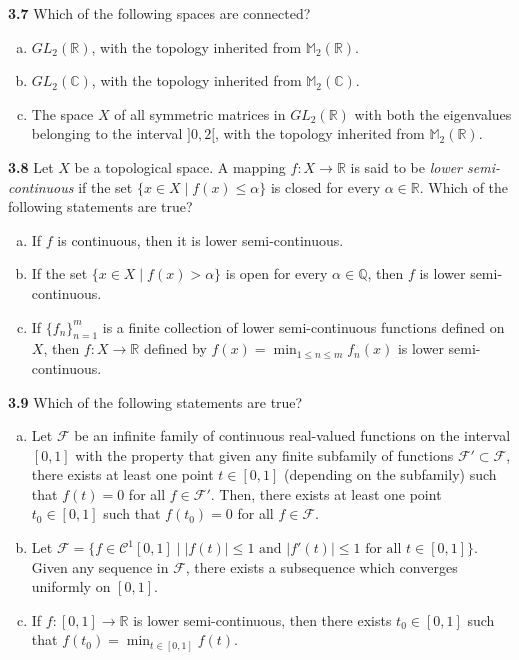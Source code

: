 \documentclass[11pt,a4paper]{article}
\newcommand{\Q}{\mathbb{Q}}
\newcommand{\R}{\mathbb{R}}
\newcommand{\C}{\mathbb{C}}
\newcommand{\M}{\mathbb{M}}
\newcommand{\qitem}[1]{\par\medskip\noindent\textbf{#1}\hspace{0.5em}}
\begin{document}
\qitem{3.7} Which of the following spaces are connected?
\begin{enumerate}[a.]
  \item $GL_2(\R)$, with the topology inherited from $\M_2(\R)$.
  \item $GL_2(\C)$, with the topology inherited from $\M_2(\C)$.
  \item The space $X$ of all symmetric matrices in $GL_2(\R)$ with both the eigenvalues belonging to the interval $]0, 2[$, with the topology inherited from $\M_2(\R)$.
\end{enumerate}

\qitem{3.8} Let $X$ be a topological space. A mapping $f : X \to \R$ is said to be \emph{lower semi-continuous} if the set $\{x \in X \mid f(x) \le \alpha\}$ is closed for every $\alpha \in \R$. Which of the following statements are true?
\begin{enumerate}[a.]
  \item If $f$ is continuous, then it is lower semi-continuous.
  \item If the set $\{x \in X \mid f(x) > \alpha\}$ is open for every $\alpha \in \Q$, then $f$ is lower semi-continuous.
  \item If $\{f_n\}_{n=1}^{m}$ is a finite collection of lower semi-continuous functions defined on $X$, then $f : X \to \R$ defined by $f(x) = \min_{1 \le n \le m} f_n(x)$ is lower semi-continuous.
\end{enumerate}

\qitem{3.9} Which of the following statements are true?
\begin{enumerate}[a.]
  \item Let $\mathcal{F}$ be an infinite family of continuous real-valued functions on the interval $[0, 1]$ with the property that given any finite subfamily of functions $\mathcal{F}' \subset \mathcal{F}$, there exists at least one point $t \in [0, 1]$ (depending on the subfamily) such that $f(t) = 0$ for all $f \in \mathcal{F}'$. Then, there exists at least one point $t_0 \in [0, 1]$ such that $f(t_0) = 0$ for all $f \in \mathcal{F}$.
  \item Let $\mathcal{F} = \{f \in \mathcal{C}^1[0, 1] \mid |f(t)| \le 1 \text{ and } |f'(t)| \le 1 \text{ for all } t \in [0, 1]\}$. Given any sequence in $\mathcal{F}$, there exists a subsequence which converges uniformly on $[0, 1]$.
  \item If $f : [0, 1] \to \R$ is lower semi-continuous, then there exists $t_0 \in [0, 1]$ such that $f(t_0) = \min_{t \in [0, 1]} f(t)$.
\end{enumerate}
\end{document}
